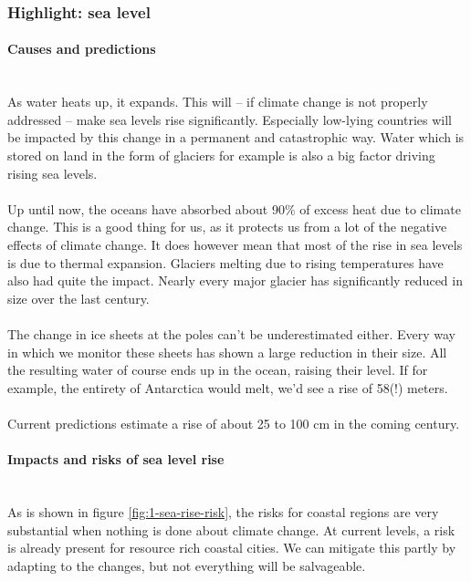 \documentclass[../summary.tex]{subfiles}
\begin{document}
			\newpage
			\subsubsection{Highlight: sea level}
				\paragraph{Causes and predictions}\mbox{}\\
					As water heats up, it expands. This will -- if climate change is not properly addressed -- make sea levels rise significantly. Especially low-lying countries will be impacted by this change in a permanent and catastrophic way. Water which is stored on land in the form of glaciers for example is also a big factor driving rising sea levels. \\
					\\
					Up until now, the oceans have absorbed about 90\% of excess heat due to climate change. This is a good thing for us, as it protects us from a lot of the negative effects of climate change. It does however mean that most of the rise in sea levels is due to thermal expansion. Glaciers melting due to rising temperatures have also had quite the impact. Nearly every major glacier has significantly reduced in size over the last century.  \\
					\\
					The change in ice sheets at the poles can't be underestimated either. Every way in which we monitor these sheets has shown a large reduction in their size. All the resulting water of course ends up in the ocean, raising their level. If for example, the entirety of Antarctica would melt, we'd see a rise of 58(!) meters. \\
					\\
					Current predictions estimate a rise of about 25 to 100 cm in the coming century.  
				
				\paragraph{Impacts and risks of sea level rise}\mbox{}\\
					As is shown in figure \ref{fig:1-sea-rise-risk}, the risks for coastal regions are very substantial when nothing is done about climate change. At current levels, a risk is already present for resource rich coastal cities. We can mitigate this partly by adapting to the changes, but not everything will be salvageable.\\
					
\end{document}
